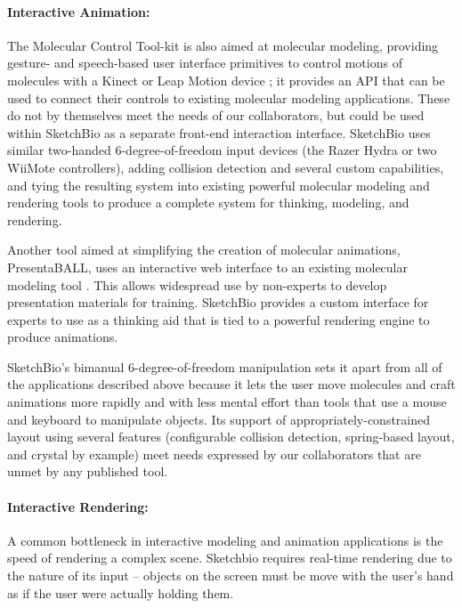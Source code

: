 \documentclass[twocolumn]{bmcart}%
\begin{document}
\paragraph*{Interactive Animation:}
The Molecular Control Tool-kit \cite{sabirmolecular} is also aimed at molecular modeling, providing gesture- and speech-based user interface primitives to control motions of molecules with a Kinect or Leap Motion device \cite{sabirmolecular}; it provides an API that can be used to connect their controls to existing molecular modeling applications.  These do not by themselves meet the needs of our collaborators, but could be used within SketchBio as a separate front-end interaction interface.
SketchBio uses similar two-handed 6-degree-of-freedom input devices (the Razer Hydra or two WiiMote controllers), adding collision detection and several custom capabilities, and tying the resulting system into existing powerful molecular modeling and rendering tools to produce a complete system for thinking, modeling, and rendering.

Another tool aimed at simplifying the creation of molecular animations, PresentaBALL\cite{nickelspresentaball}, uses an interactive web interface to an existing molecular modeling tool \cite{nickelspresentaball}.
This allows widespread use by non-experts to develop presentation materials for training.  SketchBio provides a custom interface for experts to use as a thinking aid that is tied to a powerful rendering engine to produce animations.

SketchBio's bimanual 6-degree-of-freedom manipulation sets it apart from all of the applications described above because it lets the user move molecules and craft animations more rapidly and with less mental effort than tools that use a mouse and keyboard to manipulate objects. Its support of appropriately-constrained layout using several features (configurable collision detection, spring-based layout,  and crystal by example) meet needs expressed by our collaborators that are unmet by any published tool.

\paragraph*{Interactive Rendering:}
A common bottleneck in interactive modeling and animation applications is the speed of rendering a complex scene.
Sketchbio requires real-time rendering due to the nature of its input -- objects on the screen must be move with the user's hand as if the user were actually holding them. 
\end{document}
